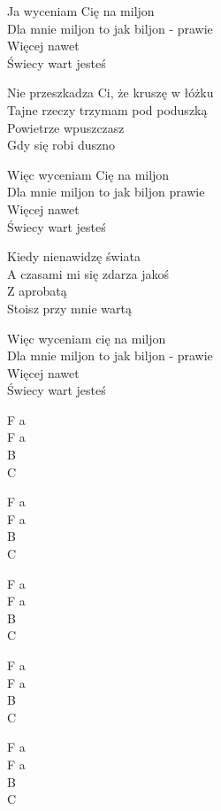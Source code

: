 \begin{text}
    Ja wyceniam Cię na miljon\\
    Dla mnie miljon to jak biljon - prawie\\
    Więcej nawet\\
    Świecy wart jesteś

    Nie przeszkadza Ci, że kruszę w łóżku\\
    Tajne rzeczy trzymam pod poduszką\\
    Powietrze wpuszczasz\\
    Gdy się robi duszno

    Więc wyceniam Cię na miljon\\
    Dla mnie miljon to jak biljon prawie\\
    Więcej nawet\\
    Świecy wart jesteś

    Kiedy nienawidzę świata\\
    A czasami mi się zdarza jakoś\\
    Z aprobatą\\
    Stoisz przy mnie wartą

    Więc wyceniam cię na miljon\\
    Dla mnie miljon to jak biljon - prawie\\
    Więcej nawet\\
    Świecy wart jesteś
\end{text}
\begin{chord}
    F a\\
    F a\\
    B\\
    C

    F a\\
    F a\\
    B\\
    C

    F a\\
    F a\\
    B\\
    C

    F a\\
    F a\\
    B\\
    C

    F a\\
    F a\\
    B\\
    C
\end{chord}